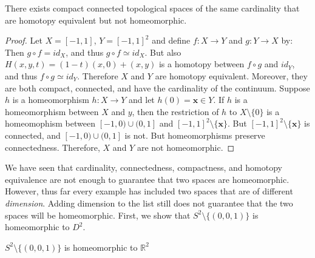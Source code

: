 \documentclass{article}                                                        %
\begin{document}
        \begin{theorem}
            There exists compact connected topological spaces of the same
            cardinality that are homotopy equivalent but not homeomorphic.
        \end{theorem}
        \begin{proof}
            Let $X=[-1,1]$, $Y=[-1,1]^{2}$ and define
            $f:X\rightarrow{Y}$ and $g:Y\rightarrow{X}$ by:
            Then $g\circ{f}=id_{X}$, and thus $g\circ{f}\simeq{id_{X}}$. But
            also $H(x,y,t)=(1-t)(x,0)+(x,y)$ is a homotopy between
            $f\circ{g}$ and $id_{Y}$, and thus $f\circ{g}\simeq{id_{Y}}$.
            Therefore $X$ and $Y$ are homotopy equivalent. Moreover, they
            are both compact, connected, and have the cardinality
            of the continuum. Suppose $h$ is a homeomorphism
            $h:X\rightarrow{Y}$ and let $h(0)=\mathbf{x}\in{Y}$. If $h$ is
            a homeomorphism between $X$ and $y$, then the restriction of $h$
            to $X\setminus\{0\}$ is a homeomophism between $[-1,0)\cup(0,1]$
            and $[-1,1]^{2}\setminus\{\mathbf{x}\}$. But
            $[-1,1]^{2}\setminus\{\mathbf{x}\}$ is connected, and
            $[-1,0)\cup(0,1]$ is not. But homeomorphisms preserve
            connectedness. Therefore, $X$ and $Y$ are not homeomorphic.
        \end{proof}
        We have seen that cardinality, connectedness, compactness, and
        homotopy equivalence are not enough to guarantee that two spaces are
        homeomorphic. However, thus far every example has included two
        spaces that are of different \textit{dimension}. Adding dimension to
        the list still does not guarantee that the two spaces will be
        homeomorphic. First, we show that $S^{2}\setminus\{(0,0,1)\}$ is
        homeomorphic to $D^{2}$.
        \begin{theorem}
            \label{thm:sphere_without_point_homeomorphic_to_plane}%
            $S^{2}\setminus\{(0,0,1)\}$ is homeomorphic to $\mathbb{R}^{2}$
        \end{theorem}
\end{document}
